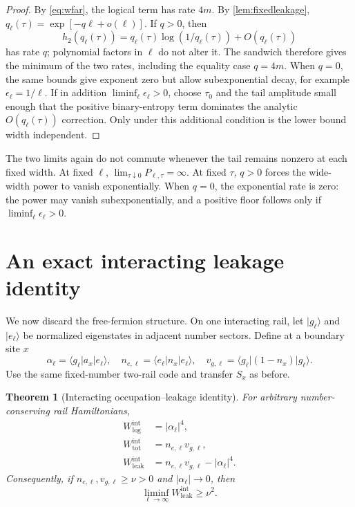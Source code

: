 \documentclass[11pt,a4paper]{article}
\newtheorem{theorem}{Theorem}[section]
\theoremstyle{remark}
\begin{document}
\begin{proof}
By \cref{eq:wfar}, the logical term has rate $4m$.  By \cref{lem:fixedleakage}, $q_\ell(\tau)=\exp[-q\ell+o(\ell)]$.  If $q>0$, then
\[
 h_2(q_\ell(\tau))
 =q_\ell(\tau)\log(1/q_\ell(\tau))+O(q_\ell(\tau))
\]
has rate $q$; polynomial factors in $\ell$ do not alter it.  The sandwich therefore gives the minimum of the two rates, including the equality case $q=4m$.  When $q=0$, the same bounds give exponent zero but allow subexponential decay, for example $\epsilon_\ell=1/\ell$.  If in addition $\liminf_\ell\epsilon_\ell>0$, choose $\tau_0$ and the tail amplitude small enough that the positive binary-entropy term dominates the analytic $O(q_\ell(\tau))$ correction.  Only under this additional condition is the lower bound width independent.
\end{proof}

The two limits again do not commute whenever the tail remains nonzero at each fixed width.  At fixed $\ell$, $\lim_{\tau\downarrow0}P_{\ell,\tau}=\infty$.  At fixed $\tau$, $q>0$ forces the wide-width power to vanish exponentially.  When $q=0$, the exponential rate is zero: the power may vanish subexponentially, and a positive floor follows only if $\liminf_\ell\epsilon_\ell>0$.

\section{An exact interacting leakage identity}

We now discard the free-fermion structure.  On one interacting rail, let $|g_\ell\rangle$ and $|e_\ell\rangle$ be normalized eigenstates in adjacent number sectors.  Define at a boundary site $x$
\[
 \alpha_\ell=\langle g_\ell|a_x|e_\ell\rangle,
 \quad
 n_{e,\ell}=\langle e_\ell|n_x|e_\ell\rangle,
 \quad
 v_{g,\ell}=\langle g_\ell|(1-n_x)|g_\ell\rangle.
\]
Use the same fixed-number two-rail code and transfer $S_x$ as before.

\begin{theorem}[Interacting occupation--leakage identity]\label{thm:interactingidentity}
For arbitrary number-conserving rail Hamiltonians,
\begin{align}
 W_{\log}^{\mathrm{int}}&=|\alpha_\ell|^4,\\
 W_{\mathrm{tot}}^{\mathrm{int}}&=n_{e,\ell}v_{g,\ell},\\
 W_{\mathrm{leak}}^{\mathrm{int}}&=n_{e,\ell}v_{g,\ell}-|\alpha_\ell|^4.
\end{align}
Consequently, if $n_{e,\ell},v_{g,\ell}\ge\nu>0$ and $|\alpha_\ell|\to0$, then
\[
 \liminf_{\ell\to\infty}W_{\mathrm{leak}}^{\mathrm{int}}\ge\nu^2.
\]
\end{theorem}
\end{document}
